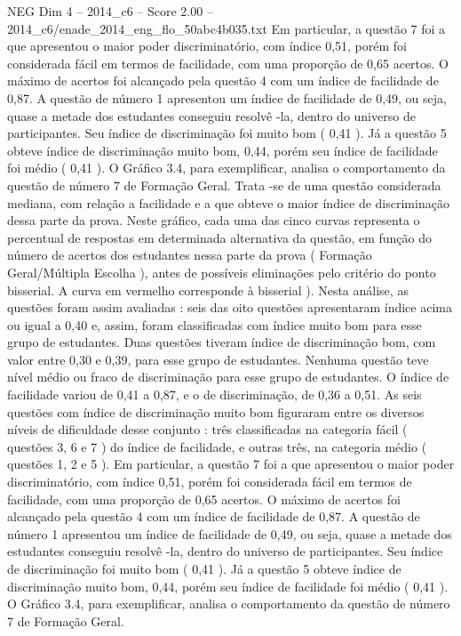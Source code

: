 \begin{textsample}{NEG Dim 4 – 2014\_c6 – Score 2.00 – 2014\_c6/enade\_2014\_eng\_flo\_50abc4b035.txt}
Em particular, a questão 7 foi a que apresentou o maior poder discriminatório, com índice 0,51, porém foi considerada fácil em termos de facilidade, com uma proporção de 0,65 acertos.
O máximo de acertos foi alcançado pela questão 4 com um índice de facilidade de 0,87.
A questão de número 1 apresentou um índice de facilidade de 0,49, ou seja, quase a metade dos estudantes conseguiu resolvê -la, dentro do universo de participantes.
Seu índice de discriminação foi muito bom ( 0,41 ).
Já a questão 5 obteve índice de discriminação muito bom, 0,44, porém seu índice de facilidade foi médio ( 0,41 ).
O Gráfico 3.4, para exemplificar, analisa o comportamento da questão de número 7 de Formação Geral.
Trata -se de uma questão considerada mediana, com relação a facilidade e a que obteve o maior índice de discriminação dessa parte da prova.
Neste gráfico, cada uma das cinco curvas representa o percentual de respostas em determinada alternativa da questão, em função do número de acertos dos estudantes nessa parte da prova ( Formação Geral/Múltipla Escolha ), antes de possíveis eliminações pelo critério do ponto bisserial.
A curva em vermelho corresponde à bisserial ).
Nesta análise, as questões foram assim avaliadas : seis das oito questões apresentaram índice acima ou igual a 0,40 e, assim, foram classificadas com índice muito bom para esse grupo de estudantes.
Duas questões tiveram índice de discriminação bom, com valor entre 0,30 e 0,39, para esse grupo de estudantes.
Nenhuma questão teve nível médio ou fraco de discriminação para esse grupo de estudantes.
O índice de facilidade variou de 0,41 a 0,87, e o de discriminação, de 0,36 a 0,51.
As seis questões com índice de discriminação muito bom figuraram entre os diversos níveis de dificuldade desse conjunto : três classificadas na categoria fácil ( questões 3, 6 e 7 ) do índice de facilidade, e outras três, na categoria médio ( questões 1, 2 e 5 ).
Em particular, a questão 7 foi a que apresentou o maior poder discriminatório, com índice 0,51, porém foi considerada fácil em termos de facilidade, com uma proporção de 0,65 acertos.
O máximo de acertos foi alcançado pela questão 4 com um índice de facilidade de 0,87.
A questão de número 1 apresentou um índice de facilidade de 0,49, ou seja, quase a metade dos estudantes conseguiu resolvê -la, dentro do universo de participantes.
Seu índice de discriminação foi muito bom ( 0,41 ).
Já a questão 5 obteve índice de discriminação muito bom, 0,44, porém seu índice de facilidade foi médio ( 0,41 ).
O Gráfico 3.4, para exemplificar, analisa o comportamento da questão de número 7 de Formação Geral.

\end{textsample}
